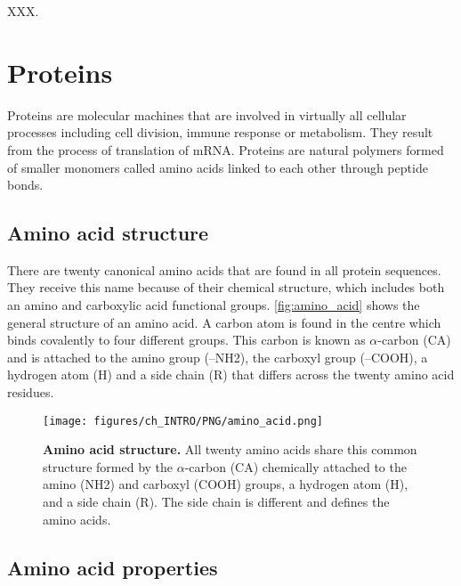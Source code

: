 XXX.

\section{Proteins}

Proteins are molecular machines that are involved in virtually all cellular processes including cell division, immune response or metabolism. They result from the process of translation of mRNA. Proteins are natural polymers formed of smaller monomers called amino acids linked to each other through peptide bonds.

\subsection{Amino acid structure}

There are twenty canonical amino acids that are found in all protein sequences. They receive this name because of their chemical structure, which includes both an amino and carboxylic acid functional groups. \autoref{fig:amino_acid} shows the general structure of an amino acid. A carbon atom is found in the centre which binds covalently to four different groups. This carbon is known as $\alpha$-carbon (CA) and is attached to the amino group (--NH2), the carboxyl group (--COOH), a hydrogen atom (H) and a side chain (R) that differs across the twenty amino acid residues.

\begin{figure}[htbp!]
    \centering
    \texttt{[image: figures/ch\_INTRO/PNG/amino\_acid.png]}
    \caption[Amino acid structure]{\textbf{Amino acid structure.} All twenty amino acids share this common structure formed by the $\alpha$-carbon (CA) chemically attached to the amino (NH2) and carboxyl (COOH) groups, a hydrogen atom (H), and a side chain (R). The side chain is different and defines the amino acids.}
    \label{fig:amino_acid}
\end{figure}

\subsection{Amino acid properties}

